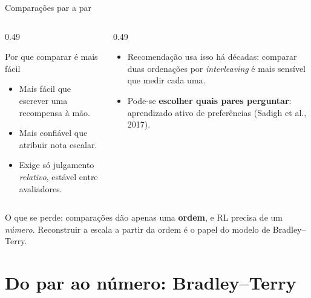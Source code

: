 \documentclass[aspectratio=169, 11pt]{beamer}
\begin{document}
\begin{frame}{Comparações par a par}

  \vspace{-0.2em}
  \begin{columns}[T]
  \begin{column}{0.49\textwidth}
    \begin{defbox}{Por que comparar é mais fácil}
      \begin{itemize}\setlength{\itemsep}{0.15ex}
        \item Mais fácil que escrever uma recompensa à mão.
        \item Mais confiável que atribuir nota escalar.
        \item Exige só julgamento \emph{relativo}, estável entre avaliadores.
      \end{itemize}
    \end{defbox}
  \end{column}
  \begin{column}{0.49\textwidth}
    \begin{itemize}\setlength{\itemsep}{0.3ex}
      \item Recomendação usa isso há décadas: comparar duas ordenações por
        \emph{interleaving} é mais sensível que medir cada uma.
      \item Pode-se \textbf{escolher quais pares perguntar}: aprendizado ativo
        de preferências {\scriptsize(Sadigh et al., 2017)}.
    \end{itemize}
  \end{column}
  \end{columns}

  \begin{alertabox}
    O que se perde: comparações dão apenas uma \textbf{ordem}, e RL precisa de um
    \emph{número}. Reconstruir a escala a partir da ordem é o papel do modelo de
    Bradley--Terry.
  \end{alertabox}
\end{frame}

\section{Do par ao número: Bradley--Terry}
\end{document}
